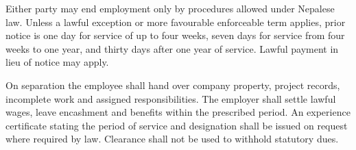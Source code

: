 Either party may end employment only by procedures allowed under Nepalese law.
Unless a lawful exception or more favourable enforceable term applies, prior
notice is one day for service of up to four weeks, seven days for service
from four weeks to one year, and thirty days after one year of service.
Lawful payment in lieu of notice may apply.

On separation the employee shall hand over company property, project records,
incomplete work and assigned responsibilities. The employer shall settle lawful
wages, leave encashment and benefits within the prescribed period. An experience
certificate stating the period of service and designation shall be issued on
request where required by law. Clearance shall not be used to withhold
statutory dues.
